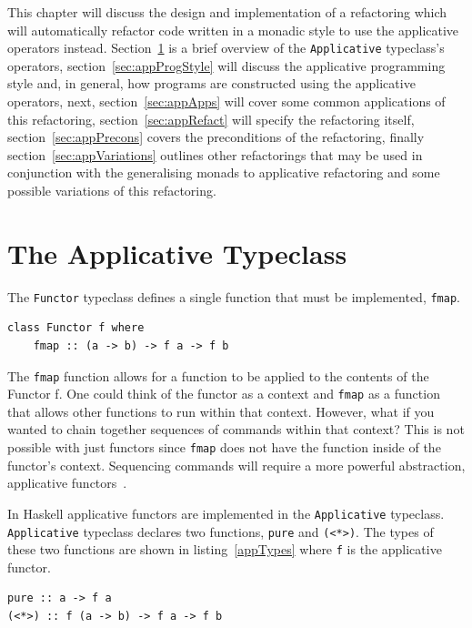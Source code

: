 This chapter will discuss the design and implementation of a refactoring which will automatically refactor code written in a monadic style to use the applicative operators instead. Section~\ref{sec:appOverview} is a brief overview of the \texttt{Applicative} typeclass's operators, section~\ref{sec:appProgStyle} will discuss the applicative programming style and, in general, how programs are constructed using the applicative operators, next, section~\ref{sec:appApps} will cover some common applications of this refactoring, section~\ref{sec:appRefact} will specify the refactoring itself, section~\ref{sec:appPrecons} covers the preconditions of the refactoring, finally section~\ref{sec:appVariations} outlines other refactorings that may be used in conjunction with the generalising monads to applicative refactoring and some possible variations of this refactoring. 

\section{The Applicative Typeclass}
\label{sec:appOverview}

The \texttt{Functor} typeclass defines a single function that must be implemented, \texttt{fmap}.

\begin{lstlisting}[frame=tblr]
class Functor f where
	fmap :: (a -> b) -> f a -> f b
\end{lstlisting}

The \texttt{fmap} function allows for a function to be applied to the contents of the Functor f. One could think of the functor as a context and \texttt{fmap} as a function that allows other functions to run within that context. However, what if you wanted to chain together sequences of commands within that context? This is not possible with just functors since \texttt{fmap} does not have the function inside of the functor's context. Sequencing commands will require a more powerful abstraction, applicative functors~\citep{realWorldHaskell}. 

In Haskell applicative functors are implemented in the \texttt{Applicative} typeclass. \texttt{Applicative} typeclass declares two functions, \texttt{pure} and \texttt{(<*>)}. The types of these two functions are shown in listing~\ref{appTypes} where \texttt{f} is the applicative functor. 

\begin{lstlisting}[frame=tblr,label=appTypes,caption={Types of Applicative's minimal complete definition}]
pure :: a -> f a
(<*>) :: f (a -> b) -> f a -> f b
\end{lstlisting}

